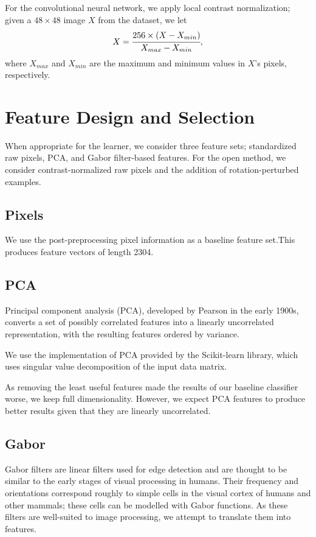 \documentclass{acm_proc_article-sp}
\begin{document}
For the convolutional neural network, we apply local contrast normalization; given a $48\times48$ image $X$ from the dataset, we let $$X = \cfrac{256\times (X - X_{min})}{X_{max} - X_{min}},$$ where $X_{max}$ and $X_{min}$ are the maximum and minimum values in $X$'s pixels, respectively. 

\section{Feature Design and Selection}
When appropriate for the learner, we consider three feature sets; standardized raw pixels, PCA, and Gabor filter-based features. For the open method, we consider contrast-normalized raw pixels and the addition of rotation-perturbed examples.

\subsection{Pixels}
We use the post-preprocessing pixel information as a baseline feature set.This produces feature vectors of length 2304. 

\subsection{PCA}
Principal component analysis (PCA), developed by Pearson in the early 1900s\cite{Pearson}, converts a set of possibly correlated features into a linearly uncorrelated representation, with the resulting features ordered by variance. 

We use the implementation of PCA provided by the Scikit-learn library\cite{scikit-learn}, which uses singular value decomposition of the input data matrix.

As removing the least useful features made the results of our baseline classifier worse, we keep full dimensionality. However, we expect PCA features to produce better results given that they are linearly uncorrelated.

\subsection{Gabor}
Gabor filters are linear filters used for edge detection and are thought to be similar to the early stages of visual processing in humans. Their frequency and orientations correspond roughly to simple cells in the visual cortex of humans and other mammals; these cells can be modelled with Gabor functions.\cite{Jones}\cite{Marvcelja} As these filters are well-suited to image processing, we attempt to translate them into features.
\end{document}
